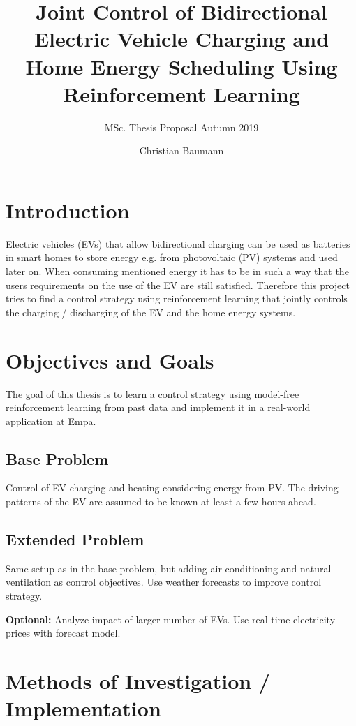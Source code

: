 \documentclass[letterpaper]{scrartcl}
\subtitle{MSc. Thesis Proposal Autumn 2019}
\title{Joint Control of Bidirectional Electric Vehicle 
	Charging and Home Energy Scheduling Using Reinforcement Learning}
\author{Christian Baumann}
\begin{document}
	\maketitle

	
	\section{Introduction}
	\label{sec:intro}
	
	Electric vehicles (EVs) that allow bidirectional charging
	can be used as batteries in smart homes to store energy
	e.g. from photovoltaic (PV) systems and used later on. 
	When consuming mentioned energy it has to be in such a way that
	the users requirements on the use of the EV are still satisfied.
	Therefore this project tries to find a control strategy using
	reinforcement learning that jointly controls the charging / 
	discharging of the EV and the home energy systems.
	
	\section{Objectives and Goals}
	
	The goal of this thesis is to learn a control strategy using model-free
	reinforcement learning from past data and implement it in a real-world
	application at Empa. 
	
	\subsection{Base Problem}
	
	Control of EV charging and heating considering energy
	from PV. The driving patterns of the EV are assumed to be known
	at least a few hours ahead. 
	
	\subsection{Extended Problem}	
	
	Same setup as in the base problem, but 
	adding air conditioning and natural ventilation as control 
	objectives. Use weather forecasts to improve control strategy.
	
	\textbf{Optional:} Analyze impact of larger number of EVs.
	Use real-time electricity prices with forecast model. 
	
	
	\section{Methods of Investigation / Implementation}
	
\end{document}
